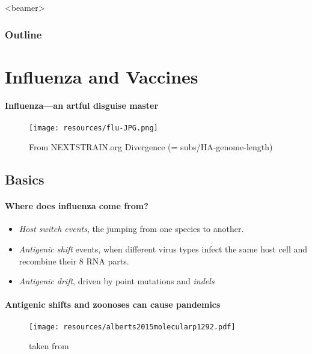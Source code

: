 \documentclass{beamer}
\begin{document}
\begin{darkframes}
  \begin{frame}<beamer>
           \frametitle{Outline}
           \footnotesize
           \tableofcontents
  \end{frame}







  \section{Influenza and Vaccines}

    \begin{frame}{\secname}
      \framesubtitle{Influenza---an artful disguise master}
      \begin{figure}
        \texttt{[image: resources/flu-JPG.png]}
        \caption{\footnotesize From NEXTSTRAIN.org Divergence (= subs/HA-genome-length)}
      \end{figure}
    \end{frame}



    \subsection{Basics}

    \begin{frame}{\subsecname}
      \framesubtitle{Where does influenza come from?}
      \begin{itemize}
      \item \textit{Host switch events}, the jumping from one species to another.
      \item \textit{Antigenic shift} events, when different virus types infect the same host cell and recombine their 8 RNA parts.
      \item \textit{Antigenic drift}, driven by point mutations and \textit{indels}
      \end{itemize}
    \end{frame}

    \begin{frame}{\subsecname}
      \framesubtitle{Antigenic shifts and zoonoses can cause pandemics}
      \begin{figure}
        \texttt{[image: resources/alberts2015molecularp1292.pdf]}
        \caption{taken from \cite{alberts15}}
      \end{figure}{}
    \end{frame}{}


\end{darkframes}
\end{document}
